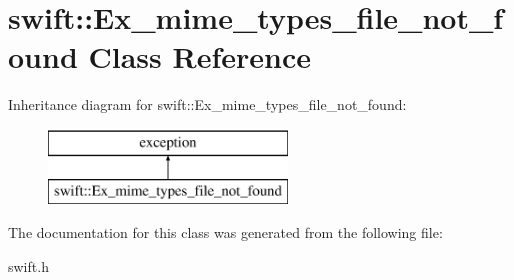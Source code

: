 \hypertarget{classswift_1_1_ex__mime__types__file__not__found}{\section{swift\-:\-:Ex\-\_\-mime\-\_\-types\-\_\-file\-\_\-not\-\_\-found Class Reference}
\label{classswift_1_1_ex__mime__types__file__not__found}
}
Inheritance diagram for swift\-:\-:Ex\-\_\-mime\-\_\-types\-\_\-file\-\_\-not\-\_\-found\-:\begin{figure}[H]
\begin{center}
\leavevmode
\includegraphics[height=2.000000cm]{classswift_1_1_ex__mime__types__file__not__found}
\end{center}
\end{figure}


The documentation for this class was generated from the following file\-:\begin{DoxyCompactItemize}
\item 
swift.\-h\end{DoxyCompactItemize}
